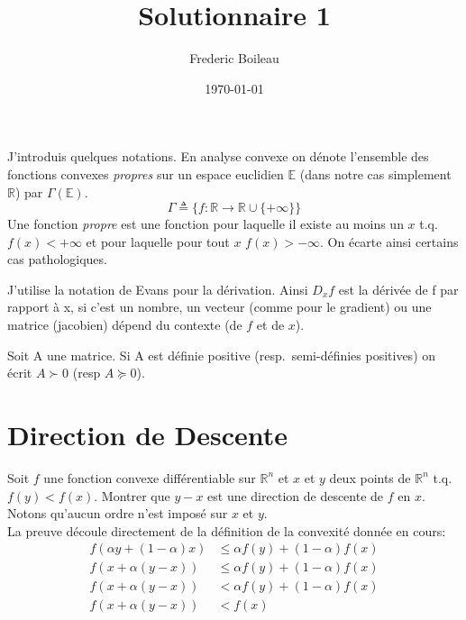 

\renewcommand{\familydefault}{\sfdefault}
\usepackage{titling}
\usepackage[backend=biber,citestyle=authoryear,style=ieee]{biblatex}
\usepackage{amsmath}
\usepackage{fancyhdr}
\pagestyle{fancy}

\title{Solutionnaire 1}
\author{Frederic Boileau}
\date{\today}




\fancyhf{}
\maketitle
\thispagestyle{fancy}

J'introduis quelques notations. En analyse convexe on dénote l'ensemble
des fonctions convexes \emph{propres} sur un espace euclidien $\mathbb E$
(dans notre cas simplement $\mathbb R$) par $\Gamma (\mathbb E)$.
\begin{equation*}
    \Gamma \triangleq \{f : \mathbb R \rightarrow \mathbb R \cup \{+\infty\}\}
\end{equation*}
Une fonction \emph{propre} est une fonction pour laquelle il existe au moins un
$x$ t.q. $f(x) < + \infty $ et pour laquelle pour tout $x$ $f(x) > -\infty$. 
On écarte ainsi certains cas pathologiques.

J'utilise la notation de Evans pour la d\'erivation. Ainsi $D_x f$ 
est la d\'eriv\'ee de f par rapport \`a x, si c'est un nombre, un vecteur
(comme pour le gradient) ou une matrice (jacobien) d\'epend du contexte
(de $f$ et de $x$). 

Soit A une matrice. Si A est d\'efinie positive  (resp.\  semi-d\'efinies
positives) on \'ecrit $A \succ 0$ (resp $A \succeq 0$).

\section{Direction de Descente}

Soit $f$ une fonction convexe différentiable sur $\mathbb R^n$ 
et $x$ et $y$ deux points de $\mathbb R^n$ t.q. $f(y) < f(x)$.
Montrer que $y-x$ est une direction de descente de $f$ en $x$.
Notons qu'aucun ordre n'est impos\'e  sur $x$ et $y$.\\

La preuve d\'ecoule directement de la d\'efinition de la 
convexit\'e donn\'ee en cours:
\begin{align*}
    f(\alpha y + (1-\alpha)x) &\leq \alpha f(y) + (1-\alpha)f(x)\\
    f(x + \alpha(y-x)) &\leq \alpha f(y) + (1-\alpha)f(x)\\
    f(x + \alpha(y-x)) &< \alpha f(y) + (1-\alpha)f(x)\\
    f(x + \alpha(y-x)) &< f(x)
\end{align*}

